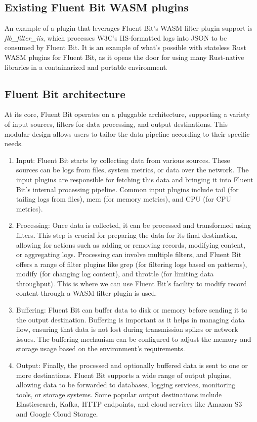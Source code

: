 \subsection{Existing Fluent Bit WASM plugins}
An example of a plugin that leverages Fluent Bit's WASM filter plugin support is \textit{flb\_filter\_iis}\cite{Ortega}, which processes W3C's IIS-formatted logs into JSON to be consumed by Fluent Bit. It is an example of what's possible with stateless Rust WASM plugins for Fluent Bit, as it opens the door for using many Rust-native libraries in a containarized and portable environment. 

\subsection{Fluent Bit architecture}
At its core, Fluent Bit operates on a pluggable architecture, supporting a variety of input sources, filters for data processing, and output destinations. This modular design allows users to tailor the data pipeline according to their specific needs.
\begin{enumerate}
    \item Input: Fluent Bit starts by collecting data from various sources. These sources can be logs from files, system metrics, or data over the network. The input plugins are responsible for fetching this data and bringing it into Fluent Bit's internal processing pipeline. Common input plugins include tail (for tailing logs from files), mem (for memory metrics), and CPU (for CPU metrics).
    \item Processing: Once data is collected, it can be processed and transformed using filters. This step is crucial for preparing the data for its final destination, allowing for actions such as adding or removing records, modifying content, or aggregating logs. Processing can involve multiple filters, and Fluent Bit offers a range of filter plugins like grep (for filtering logs based on patterns), modify (for changing log content), and throttle (for limiting data throughput). This is where we can use Fluent Bit's facility to modify record content through a WASM filter plugin is used.
    \item Buffering: Fluent Bit can buffer data to disk or memory before sending it to the output destination. Buffering is important as it helps in managing data flow, ensuring that data is not lost during transmission spikes or network issues. The buffering mechanism can be configured to adjust the memory and storage usage based on the environment's requirements.
    \item Output: Finally, the processed and optionally buffered data is sent to one or more destinations. Fluent Bit supports a wide range of output plugins, allowing data to be forwarded to databases, logging services, monitoring tools, or storage systems. Some popular output destinations include Elasticsearch, Kafka, HTTP endpoints, and cloud services like Amazon S3 and Google Cloud Storage.
\end{enumerate}
